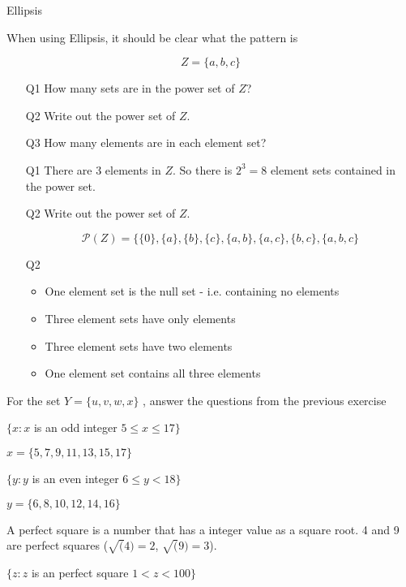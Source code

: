 Ellipsis

When using Ellipsis, it should be clear what the pattern is 


\[ Z = \{ a,b,c\}  \]
\begin{itemize}
\item[Q1] How many sets are in the power set of $Z$?
\item[Q2] Write out the power set of $Z$.
\item[Q3] How many elements are in each element set?
\end{itemize}
\begin{itemize}
\item[Q1] There are 3 elements in $Z$. So there is $2^3 = 8 $ element sets contained in the power set.

\item[Q2] Write out the power set of $Z$.

\[ \mathcal{P}(Z) = \{ \{0\}, \{a\}, \{b\}, \{c\}, \{a,b\}, \{a,c\}, \{b,c\}, \{a,b,c\} \]

\item[Q2]
\begin{itemize}
\item One element set is the null set - i.e. containing no elements
\item Three element sets have only elements
\item Three element sets have two elements
\item One element set contains all three elements
\end{itemize}

\end{itemize}

For the set $Y = \{u,v,w,x\}$ , answer the questions from the previous exercise 





$\{ x : x $ is an odd integer $ 5 \leq x \leq 17 \}$

$x = \{5,7,9,11,13,15,17\}$


$\{ y : y $ is an even integer $ 6 \leq y < 18 \}$

$y = \{6,8,10,12,14,16\}$


A perfect square is a number that has a integer value as a square root.
4 and 9 are perfect squares ($\sqrt(4) = 2$, $\sqrt(9) = 3$).


$\{ z : z $ is an perfect square $ 1 < z < 100 \}$

